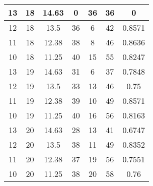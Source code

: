 \documentclass[letterpaper, 12pt]{article}
\begin{document}
\begin{longtable}{|c|c|c|c|c|c|c|}
\hline
13 & 18 & 14.63 & 0 & 36 & 36 & 0 \\
\hline
12 & 18 & 13.5 & 36 & 6 & 42 & 0.8571 \\
\hline
11 & 18 & 12.38 & 38 & 8 & 46 & 0.8636 \\
\hline
10 & 18 & 11.25 & 40 & 15 & 55 & 0.8247 \\
\hline
13 & 19 & 14.63 & 31 & 6 & 37 & 0.7848 \\
\hline
12 & 19 & 13.5 & 33 & 13 & 46 & 0.75 \\
\hline
11 & 19 & 12.38 & 39 & 10 & 49 & 0.8571 \\
\hline
10 & 19 & 11.25 & 40 & 16 & 56 & 0.8163 \\
\hline
13 & 20 & 14.63 & 28 & 13 & 41 & 0.6747 \\
\hline
12 & 20 & 13.5 & 38 & 11 & 49 & 0.8352 \\
\hline
11 & 20 & 12.38 & 37 & 19 & 56 & 0.7551 \\
\hline
10 & 20 & 11.25 & 38 & 20 & 58 & 0.76 \\
\hline
\end{longtable}
\end{document}
